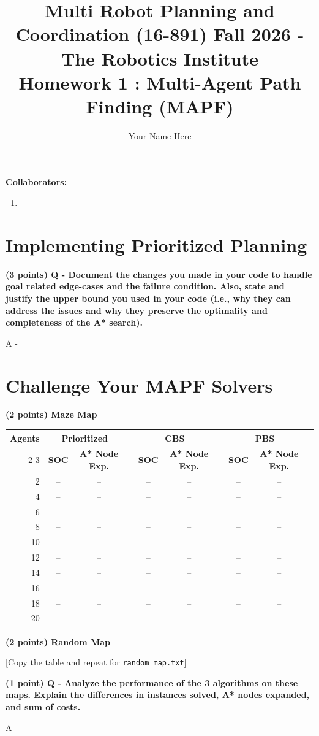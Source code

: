\documentclass[11pt]{article}
\title
{ 
{\small Multi Robot Planning and Coordination (16-891) Fall 2026 - The Robotics Institute} \\
Homework 1 : Multi-Agent Path Finding (MAPF) \\

}
\author{Your Name Here}
\begin{document}
\maketitle

\textbf{Collaborators: }
\begin{enumerate}
    \item 
\end{enumerate}


\section{Implementing Prioritized Planning}

\textbf{(3 points) Q - Document the changes you made in your code to handle goal related edge-cases and the failure condition. Also, state and justify the upper bound you used in your code (i.e., why they can address the issues and why they preserve the optimality and completeness of the A* search).}

A - %

\newpage

\section{Challenge Your MAPF Solvers}

\textbf{(2 points) Maze Map}

\begin{table}[htbp]
  \centering
  \label{tab:planner_results}
  \begin{tabular}{r ccc ccc ccc}
    \toprule
    \multirow{2}{*}{\textbf{Agents}} 
      & \multicolumn{2}{c}{\textbf{Prioritized}} 
      & & \multicolumn{2}{c}{\textbf{CBS}} 
      & & \multicolumn{2}{c}{\textbf{PBS}} \\
    \cmidrule{2-3} \cmidrule{5-6} \cmidrule{8-9}
      & \textbf{SOC} & \textbf{A* Node Exp.} 
      & & \textbf{SOC} & \textbf{A* Node Exp.} 
      & & \textbf{SOC} & \textbf{A* Node Exp.} \\
    \midrule
    2   & -- & -- & & -- & -- & & -- & -- \\
    4   & -- & -- & & -- & -- & & -- & -- \\
    6   & -- & -- & & -- & -- & & -- & -- \\
    8   & -- & -- & & -- & -- & & -- & -- \\
    10  & -- & -- & & -- & -- & & -- & -- \\
    12 & -- & -- & & -- & -- & & -- & -- \\
    14 & -- & -- & & -- & -- & & -- & -- \\
    16 & -- & -- & & -- & -- & & -- & -- \\
    18 & -- & -- & & -- & -- & & -- & -- \\
    20 & -- & -- & & -- & -- & & -- & -- \\
    \bottomrule
  \end{tabular}
\end{table}

\textbf{(2 points) Random Map}

[Copy the table and repeat for \texttt{random\_map.txt}]

\textbf{(1 point) Q - Analyze the performance of the 3 algorithms on these maps. Explain the differences in instances solved, A* nodes expanded, and sum of costs.}

A - %
\end{document}
